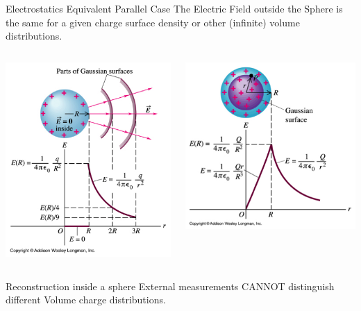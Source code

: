 \documentclass{beamer}
\begin{document}
 \begin{frame}{Electrostatics Equivalent Parallel Case }
 The Electric Field outside the Sphere is the same for a given charge surface  density 
or other (infinite) volume  distributions.
 \begin{columns}
	\begin{center}
	\includegraphics[width=.5\columnwidth]{surfcharge.png}
	\end{center}	
	\begin{center}
	\includegraphics[width=.5\columnwidth]{volcharge.png}
	\end{center}

\end{columns}	

 \begin{block}{Reconstruction inside a sphere } 
	External  measurements  CANNOT distinguish different Volume charge distributions.
\end{block} 
\end{frame}
\end{document}
